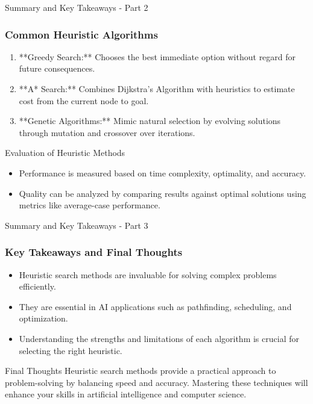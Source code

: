 \documentclass[aspectratio=169]{beamer}
\begin{document}
\begin{frame}[fragile]{Summary and Key Takeaways - Part 2}
    \frametitle{Common Heuristic Algorithms}
    \begin{enumerate}
        \item **Greedy Search:** Chooses the best immediate option without regard for future consequences.
        \item **A* Search:** Combines Dijkstra's Algorithm with heuristics to estimate cost from the current node to goal.
        \item **Genetic Algorithms:** Mimic natural selection by evolving solutions through mutation and crossover over iterations.
    \end{enumerate}
    \begin{block}{Evaluation of Heuristic Methods}
        \begin{itemize}
            \item Performance is measured based on time complexity, optimality, and accuracy.
            \item Quality can be analyzed by comparing results against optimal solutions using metrics like average-case performance.
        \end{itemize}
    \end{block}
\end{frame}

\begin{frame}[fragile]{Summary and Key Takeaways - Part 3}
    \frametitle{Key Takeaways and Final Thoughts}
    \begin{itemize}
        \item Heuristic search methods are invaluable for solving complex problems efficiently.
        \item They are essential in AI applications such as pathfinding, scheduling, and optimization.
        \item Understanding the strengths and limitations of each algorithm is crucial for selecting the right heuristic.
    \end{itemize}
    \begin{block}{Final Thoughts}
        Heuristic search methods provide a practical approach to problem-solving by balancing speed and accuracy. Mastering these techniques will enhance your skills in artificial intelligence and computer science.
    \end{block}
\end{frame}
\end{document}
